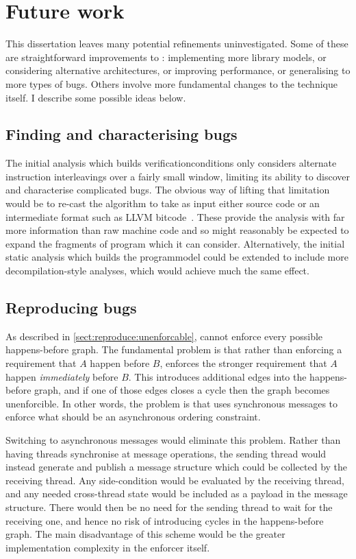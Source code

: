 \chapter{Future work}
\label{sect:fw}

This dissertation leaves many potential refinements uninvestigated.
Some of these are straightforward improvements to {\implementation}:
implementing more {\StateMachine} library models, or considering
alternative architectures, or improving performance, or generalising
to more types of bugs.  Others involve more fundamental changes to the
{\technique} technique itself.  I describe some possible ideas below.

\section{Finding and characterising bugs}

The initial analysis which builds \glspl{verificationcondition} only
considers alternate instruction interleavings over a fairly small
window, limiting its ability to discover and characterise complicated
bugs.  The obvious way of lifting that limitation would be to re-cast
the algorithm to take as input either source code or an intermediate
format such as LLVM bitcode~\cite{FFFLattner2013}.  These provide the
analysis with far more information than raw machine code and so might
reasonably be expected to expand the fragments of program which it can
consider.  Alternatively, the initial static analysis which builds the
\gls{programmodel} could be extended to include more
decompilation-style analyses, which would achieve much the same
effect.

\section{Reproducing bugs}

As described in \autoref{sect:reproduce:unenforcable}, {\technique}
cannot enforce every possible happens-before graph.  The fundamental
problem is that rather than enforcing a requirement that $A$ happen
before $B$, {\technique} enforces the stronger requirement that $A$
happen \emph{immediately} before $B$.  This introduces additional edges
into the happens-before graph, and if one of those edges closes a
cycle then the graph becomes unenforcible.  In other words, the
problem is that {\technique} uses synchronous messages to enforce what
should be an asynchronous ordering constraint.

Switching to asynchronous messages would eliminate this problem.
Rather than having threads synchronise at message operations, the
sending thread would instead generate and publish a message structure
which could be collected by the receiving thread.  Any side-condition
would be evaluated by the receiving thread, and any needed
cross-thread state would be included as a payload in the message
structure.  There would then be no need for the sending thread to wait
for the receiving one, and hence no risk of introducing cycles in the
happens-before graph.  The main disadvantage of this scheme would be
the greater implementation complexity in the enforcer itself.

